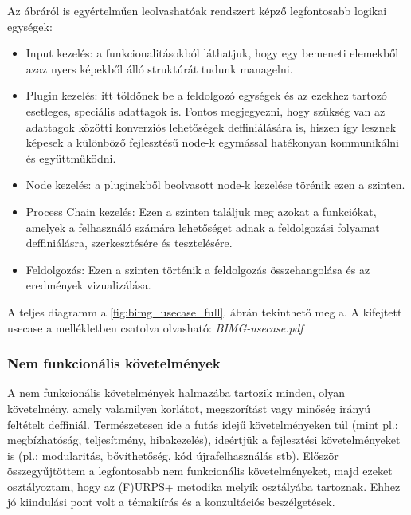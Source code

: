 \documentclass[a4paper,12pt,oneside]{report}
\begin{document}
Az ábráról is egyértelműen leolvashatóak rendszert képző legfontosabb logikai egységek:
\begin{itemize}
	\itemsep0em
	\item Input kezelés: a funkcionalitásokból láthatjuk, hogy egy bemeneti elemekből azaz nyers képekből álló struktúrát tudunk managelni.
	\item Plugin kezelés: itt töldőnek be a feldolgozó egységek és az ezekhez tartozó esetleges, speciális adattagok is. Fontos megjegyezni, hogy szükség van az adattagok közötti konverziós lehetőségek deffiniálására is, hiszen így lesznek képesek a különböző fejlesztésű node-k egymással hatékonyan kommunikálni és együttműködni.
	\item Node kezelés: a pluginekből beolvasott node-k kezelése törénik ezen a szinten.
	\item Process Chain kezelés: Ezen a szinten találjuk meg azokat a funkciókat, amelyek a felhasználó számára lehetőséget adnak a feldolgozási folyamat deffiniálásra, szerkesztésére és tesztelésére.
	\item Feldolgozás: Ezen a szinten történik a feldolgozás összehangolása és az eredmények vizualizálása.
\end{itemize}
A teljes diagramm a \ref{fig:bimg_usecase_full}. ábrán tekinthető meg a. A kifejtett usecase a mellékletben csatolva olvasható: \emph{BIMG-usecase.pdf}



\subsubsection{Nem funkcionális követelmények}
A nem funkcionális követelmények halmazába tartozik minden, olyan követelmény, amely valamilyen korlátot, megszorítást vagy minőség irányú feltételt deffiniál. \cite{publication:soft_nonfunc_req} Természetesen ide a futás idejű követelményeken túl (mint pl.: megbízhatóság, teljesítmény, hibakezelés), ideértjük a fejlesztési követelményeket is (pl.: modularitás, bővíthetőség, kód újrafelhasználás stb). Először összegyűjtöttem a legfontosabb nem funkcionális követelményeket, majd ezeket osztályoztam, hogy az (F)URPS+ metodika melyik osztályába tartoznak. Ehhez jó kiindulási pont volt a témakiírás és a konzultációs beszélgetések.
\end{document}
